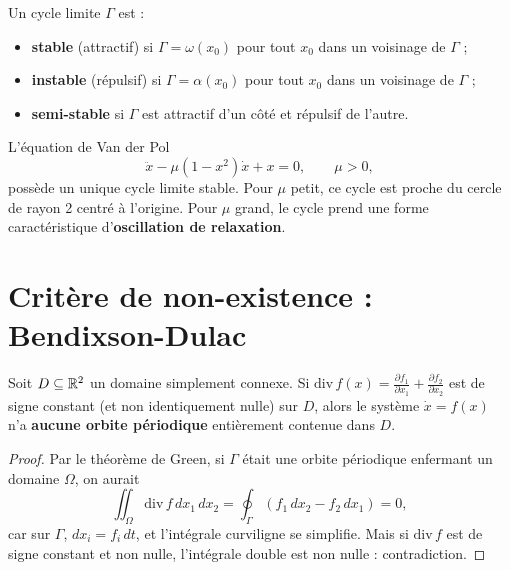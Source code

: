 \begin{definition}
Un cycle limite $\Gamma$ est :
\begin{itemize}
    \item \textbf{stable} (attractif) si $\Gamma = \omega(x_0)$ pour tout
    $x_0$ dans un voisinage de $\Gamma$ ;
    \item \textbf{instable} (r\'epulsif) si $\Gamma = \alpha(x_0)$ pour tout
    $x_0$ dans un voisinage de $\Gamma$ ;
    \item \textbf{semi-stable} si $\Gamma$ est attractif d'un c\^ot\'e et
    r\'epulsif de l'autre.
\end{itemize}
\end{definition}

\begin{exemple}
L'\'equation de Van der Pol
\[
    \ddot{x} - \mu(1 - x^2)\dot{x} + x = 0, \qquad \mu > 0,
\]
poss\`ede un unique cycle limite stable. Pour $\mu$ petit, ce cycle est
proche du cercle de rayon 2 centr\'e \`a l'origine. Pour $\mu$ grand,
le cycle prend une forme caract\'eristique d'\textbf{oscillation de relaxation}.
\end{exemple}

\section{Crit\`ere de non-existence : Bendixson-Dulac}

\begin{theoreme}
\label{thm:bendixson}
Soit $D \subseteq \mathbb{R}^2$ un domaine simplement connexe. Si
$\mathrm{div}\, f(x) = \frac{\partial f_1}{\partial x_1} + \frac{\partial f_2}{\partial x_2}$
est de signe constant (et non identiquement nulle) sur $D$, alors le
syst\`eme $\dot{x} = f(x)$ n'a \textbf{aucune orbite p\'eriodique}
enti\`erement contenue dans $D$.
\end{theoreme}

\begin{proof}
Par le th\'eor\`eme de Green, si $\Gamma$ \'etait une orbite p\'eriodique
enfermant un domaine $\Omega$, on aurait
\[
    \iint_\Omega \mathrm{div}\, f\, dx_1\, dx_2 =
    \oint_\Gamma (f_1\, dx_2 - f_2\, dx_1) = 0,
\]
car sur $\Gamma$, $dx_i = f_i\, dt$, et l'int\'egrale curviligne se simplifie.
Mais si $\mathrm{div}\, f$ est de signe constant et non nulle, l'int\'egrale
double est non nulle : contradiction.
\end{proof}


